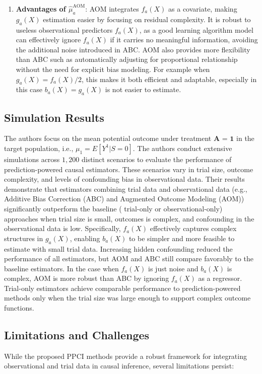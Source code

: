 \documentclass[12pt, oneside]{amsart}
\theoremstyle{definition}
\theoremstyle{remark}
\numberwithin{equation}{section}
\begin{document}
\begin{enumerate}
    \item \textbf{Advantages of $\hat{\mu}_a^{\text{AOM}}$}: AOM integrates $f_a(X)$ as a covariate, making $g_a(X)$ estimation easier by focusing on residual complexity. It is robust to useless observational predictors $f_a(X)$, as a good learning algorithm model can effectively ignore $f_a(X)$ if it carries no meaningful information, avoiding the additional noise introduced in ABC. AOM also provides more flexibility than ABC such as automatically adjusting for proportional relationship without the need for explicit bias modeling. For example when $g_a(X) = f_a(X)/2$, this makes it both efficient and adaptable, especially in this case $b_a(X) = g_a(X)$ is not easier to estimate.
    
\end{enumerate}

\subsection{Simulation Results}
The authors focus on the mean potential outcome under treatment $\textbf{A = 1}$ in the target population, i.e., $\mu_1 = E[Y^1 |S= 0]$. The authors conduct extensive simulations across $1,200$ distinct scenarios to evaluate the performance of prediction-powered causal estimators. These scenarios vary in trial size, outcome complexity, and levels of confounding bias in observational data. Their results demonstrate that estimators combining trial data and observational data (e.g., Additive Bias Correction (ABC) and Augmented Outcome Modeling (AOM)) significantly outperform the baseline ( trial-only or observational-only) approaches when trial size is small, outcomes is complex, and confounding in the observational data is low. Specifically, $f_a(X)$ effectively captures complex structures in $g_a(X)$, enabling $b_a(X)$ to be simpler and more feasible to estimate with small trial data.  Increasing hidden confounding reduced the performance of all estimators, but AOM and ABC still compare favorably to the baseline estimators. In the case when $f_a(X)$ is just noise and $b_a(X)$ is complex, AOM is more robust than ABC by ignoring $f_a(X)$ as a regressor. Trial-only estimators achieve comparable performance to prediction-powered methods only when the trial size was large enough to support complex outcome functions. \\

\subsection{Limitations and Challenges}
While the proposed PPCI methods provide a robust framework for integrating observational and trial data in causal inference, several limitations persist:
\end{document}
